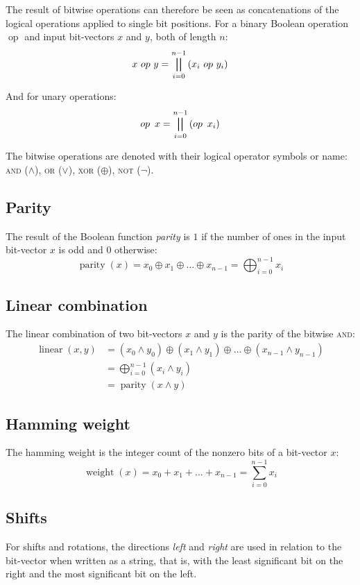 \documentclass[a4paper,10pt,twoside,openright]{book}
\renewcommand{\sc}[1]{\textsc{\lowercase{#1}}}
\DeclareMathOperator{\parity}{parity}
\DeclareMathOperator{\weight}{weight}
\DeclareMathOperator{\lin}{linear}
\begin{document}
The result of bitwise operations can therefore be seen as concatenations of the logical operations applied to single bit positions. For a binary Boolean operation $\mathop{op}$ and input bit-vectors $x$ and $y$, both of length $n$: 
\[x\,\mathop{op}\,y = \bigparallel_{i=0}^{n-1}\left(x_i\,\mathop{op}\,y_i\right)\]

And for unary operations:
\[\mathop{op}~x = \bigparallel_{i=0}^{n-1}\left(\mathop{op}~x_i\right)\]

The bitwise operations are denoted with their logical operator symbols or name: \sc{AND} ($\land$), \sc{OR} ($\lor$), \sc{XOR} ($\oplus$), \sc{NOT} ($\lnot$).

\subsection{Parity}
The result of the Boolean function \textit{parity} is $1$ if the number of ones in the input bit-vector $x$ is odd and $0$ otherwise: \[\parity(x) = x_0 \oplus x_1 \oplus \ldots \oplus x_{n-1} = \bigoplus_{i=0}^{n-1}x_i\]

\subsection{Linear combination}
\label{sec:linear}
The linear combination of two bit-vectors $x$ and $y$ is the parity of the bitwise \sc{AND}: \[
\begin{aligned}
\lin\left(x,y\right) &= \left(x_0 \land y_0\right) \oplus \left(x_1 \land y_1\right) \oplus \ldots \oplus \left(x_{n-1} \land y_{n-1}\right) \\
 & = \bigoplus_{i=0}^{n-1}\left(x_i \land y_i\right) \\
 & = \parity\left(x \land y\right)
\end{aligned}
\]

\subsection{Hamming weight}
\label{sec:hamming}
The hamming weight is the integer count of the nonzero bits of a bit-vector $x$: \[\weight(x) = x_0 + x_1 + \ldots + x_{n-1} = \sum_{i=0}^{n-1}x_i\]
\iffalse
\subsection{Shifts}

For shifts and rotations, the directions \textit{left} and \textit{right} are used in relation to the bit-vector when written as a string, that is, with the least significant bit on the right and the most significant bit on the left.
\end{document}
